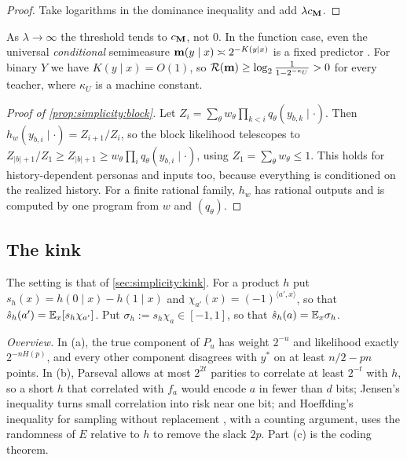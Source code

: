 \begin{proof}
Take logarithms in the dominance inequality and add $\lambda c_{\mathbf M}$.
\end{proof}

As $\lambda\to\infty$ the threshold tends to $c_{\mathbf M}$, not $0$. In the function case, even the universal \emph{conditional} semimeasure $\mathbf m(y\mid x)\asymp2^{-K(y\mid x)}$ is a fixed predictor . For binary $Y$ we have $K(y\mid x)=O(1)$, so $\mathcal R(\mathbf m)\ge\log_2\frac1{1-2^{-\kappa_U}}>0$ for every teacher, where $\kappa_U$ is a machine constant.

\begin{proof}[Proof of \cref{prop:simplicity:block}]
Let $Z_i=\sum_\theta w_\theta\prod_{k<i}q_\theta(y_{b,k}\mid\cdot)$. Then $h_w(y_{b,i}\mid\cdot)=Z_{i+1}/Z_i$, so the block likelihood telescopes to $Z_{|b|+1}/Z_1\ge Z_{|b|+1}\ge w_\theta\prod_iq_\theta(y_{b,i}\mid\cdot)$, using $Z_1=\sum_\theta w_\theta\le1$. This holds for history-dependent personas and inputs too, because everything is conditioned on the realized history. For a finite rational family, $h_w$ has rational outputs and is computed by one program from $w$ and $(q_\theta)$.
\end{proof}

\subsection{The kink}\label{app:simplicity:kink}

The setting is that of \cref{sec:simplicity:kink}. For a product $h$ put $s_h(x)=h(0\mid x)-h(1\mid x)$ and $\chi_{a'}(x)=(-1)^{\langle a',x\rangle}$, so that $\hat s_h(a')=\mathbb{E}_x[s_h\chi_{a'}]$. Put $\sigma_h:=s_h\chi_a\in[-1,1]$, so that $\hat s_h(a)=\mathbb{E}_x\sigma_h$.

\emph{Overview.} In (a), the true component of $P_u$ has weight $2^{-u}$ and likelihood exactly $2^{-nH(p)}$, and every other component disagrees with $y^*$ on at least $n/2-pn$ points. In (b), Parseval allows at most $2^{2t}$ parities to correlate at least $2^{-t}$ with $h$, so a short $h$ that correlated with $f_a$ would encode $a$ in fewer than $d$ bits; Jensen's inequality turns small correlation into risk near one bit; and Hoeffding's inequality for sampling without replacement \citep{hoeffding1963probability}, with a counting argument, uses the randomness of $E$ relative to $h$ to remove the slack $2p$. Part (c) is the coding theorem.

